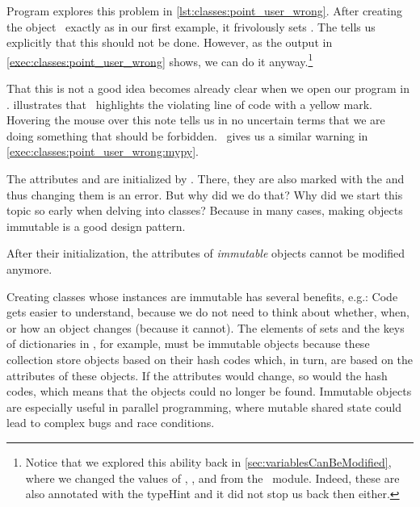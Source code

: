 Program  explores this problem in \cref{lst:classes:point_user_wrong}.
After creating the  object~ exactly as in our first example, it frivolously sets .
The   tells us explicitly that this should not be done.
However, as the output in \cref{exec:classes:point_user_wrong} shows, we can do it anyway.\footnote{%
Notice that we explored this ability back in \cref{sec:variablesCanBeModified}, where we changed the values of , , and  from the ~module. %
Indeed, these are also annotated with the  \gls{typeHint} and it did not stop us back then either.}

That this is not a good idea becomes already clear when we open our program in \pycharm.
 illustrates that \pycharm\ highlights the violating line of code with a yellow mark.
Hovering the mouse over this note tells us in no uncertain terms that we are doing something that should be forbidden.
\mypy\ gives us a similar warning in \cref{exec:classes:point_user_wrong:mypy}.

The attributes  and  are initialized by .
There, they are also marked with the   and thus changing them is an error.
But why did we do that?
Why did we start this topic so early when delving into classes?
Because in many cases, making objects immutable is a good design pattern.%
%
%
%
\begin{definition}[Immutable]%
After their initialization, the attributes of \emph{immutable} objects cannot be modified anymore.%
\end{definition}%
%
Creating classes whose instances are immutable has several benefits, e.g.:
Code gets easier to understand, because we do not need to think about whether, when, or how an object changes (because it cannot).
The elements of sets and the keys of dictionaries in \python, for example, must be immutable objects because these collection store objects based on their hash codes which, in turn, are based on the attributes of these objects.
If the attributes would change, so would the hash codes, which means that the objects could no longer be found.
Immutable objects are especially useful in parallel programming, where mutable shared state could lead to complex bugs and race conditions.

